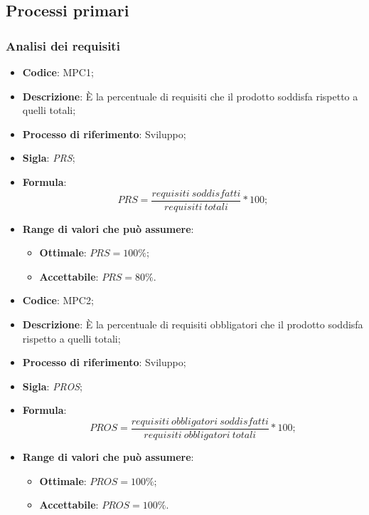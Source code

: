 \subsection{Processi primari}
\subsubsection{Analisi dei requisiti}
\vspace{-1cm}
\begin{itemize}
	\item \textbf{Codice}: MPC1;
	\item \textbf{Descrizione}: È la percentuale di requisiti che il prodotto soddisfa rispetto a quelli totali;
	\item \textbf{Processo di riferimento}: Sviluppo;
	\item \textbf{Sigla}: \textit{PRS};
	\item \textbf{Formula}: \[ PRS = \frac{requisiti \ soddisfatti}{requisiti \ totali} \ast 100; \]
	\item \textbf{Range di valori che può assumere}:
		\begin{itemize}
			\item \textbf{Ottimale}: $PRS = 100 \%$;
			\item \textbf{Accettabile}: $PRS = 80 \%$.
		\end{itemize}
\end{itemize}
\vspace{-1cm}
\begin{itemize}
	\item \textbf{Codice}: MPC2;
	\item \textbf{Descrizione}: È la percentuale di requisiti obbligatori che il prodotto soddisfa rispetto a quelli totali;
	\item \textbf{Processo di riferimento}: Sviluppo;
	\item \textbf{Sigla}: \textit{PROS};
	\item \textbf{Formula}: \[ PROS = \frac{requisiti \ obbligatori \ soddisfatti}{requisiti \ obbligatori \ totali} \ast 100; \]
	\item \textbf{Range di valori che può assumere}:
		\begin{itemize}
			\item \textbf{Ottimale}: $PROS = 100 \%$;
			\item \textbf{Accettabile}: $PROS = 100 \%$.
		\end{itemize}
\end{itemize}